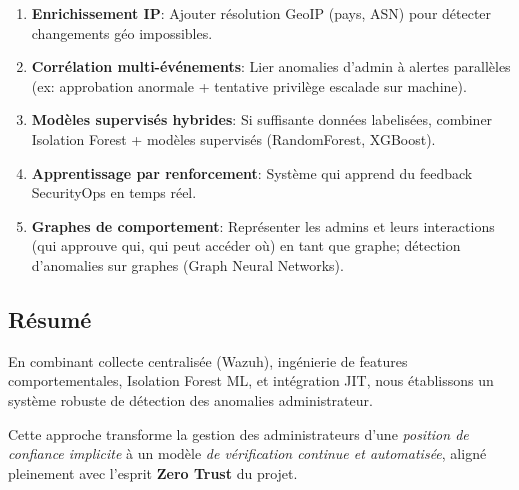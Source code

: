 \begin{enumerate}
	\item \textbf{Enrichissement IP}: Ajouter résolution GeoIP (pays, ASN) pour détecter changements géo impossibles.
	
	\item \textbf{Corrélation multi-événements}: Lier anomalies d'admin à alertes parallèles (ex: approbation anormale + tentative privilège escalade sur machine).
	
	\item \textbf{Modèles supervisés hybrides}: Si suffisante données labelisées, combiner Isolation Forest + modèles supervisés (RandomForest, XGBoost).
	
	\item \textbf{Apprentissage par renforcement}: Système qui apprend du feedback SecurityOps en temps réel.
	
	\item \textbf{Graphes de comportement}: Représenter les admins et leurs interactions (qui approuve qui, qui peut accéder où) en tant que graphe; détection d'anomalies sur graphes (Graph Neural Networks).
\end{enumerate}

\subsection{Résumé}

En combinant collecte centralisée (Wazuh), ingénierie de features comportementales, Isolation Forest ML, 
et intégration JIT, nous établissons un système robuste de détection des anomalies administrateur. 

Cette approche transforme la gestion des administrateurs d'une \textit{position de confiance implicite} 
à un modèle \textit{de vérification continue et automatisée}, aligné pleinement avec l'esprit \textbf{Zero Trust} du projet.